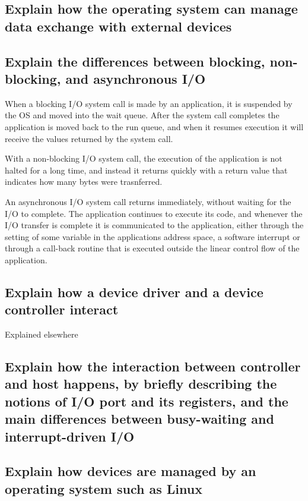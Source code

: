 \documentclass{article}
\begin{document}
\subsection{Explain how the operating system can manage data exchange with external devices}

\subsection{Explain the differences between blocking, non-blocking, and asynchronous I/O}
When a blocking I/O system call is made by an application, it is suspended by the OS and moved into the wait queue. After the system call completes the application is moved back to the run queue, and when it resumes execution it will receive the values returned by the system call.

With a non-blocking I/O system call, the execution of the application is not halted for a long time, and instead it returns quickly with a return value that indicates how many bytes were trasnferred.

An asynchronous I/O system call returns immediately, without waiting for the I/O to complete. The application continues to execute its code, and whenever the I/O transfer is complete it is communicated to the application, either through the setting of some variable in the applications address space, a software interrupt or through a call-back routine that is executed outside the linear control flow of the application.

\subsection{Explain how a device driver and a device controller interact}
Explained elsewhere

\subsection{Explain how the interaction between controller and host happens, by briefly describing the notions of I/O port and its registers, and the main differences between busy-waiting and interrupt-driven I/O}

\subsection{Explain how devices are managed by an operating system such as Linux}
\end{document}
